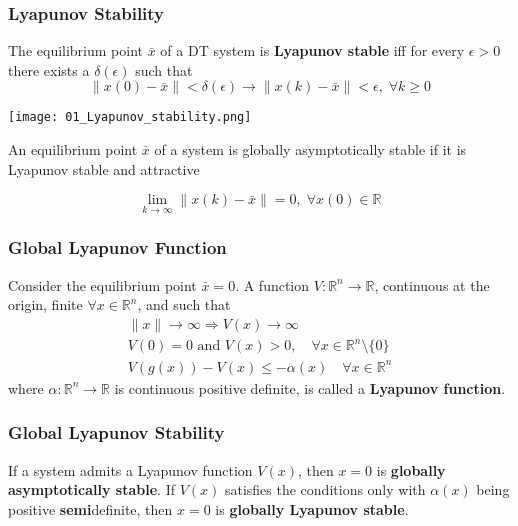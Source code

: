 \subsubsection{Lyapunov Stability}

The equilibrium point $\bar{x}$ of a DT system is \textbf{Lyapunov stable} iff for every $\epsilon >0$ there exists a $\delta(\epsilon)$ such that
\begin{equation*}
    \lVert x(0) - \bar{x} \rVert < \delta(\epsilon) \to \lVert x(k) - \bar{x} \rVert < \epsilon, \; \forall k \geq 0
\end{equation*}

\begin{center}
    \texttt{[image: 01\_Lyapunov\_stability.png]}
\end{center}


An equilibrium point $\bar{x}$ of a system is globally asymptotically stable if it is Lyapunov stable and attractive

\begin{equation*}
    \lim_{k\to\infty} \lVert x(k) - \bar{x} \rVert = 0, \; \forall x(0) \in \mathbb{R}
\end{equation*}


\subsubsection{Global Lyapunov Function}

Consider the equilibrium point $\bar{x}=0$. A function $V:\mathbb{R}^n\to \mathbb{R}$, continuous at the origin, finite $\forall x \in \mathbb{R}^n$, and such that
\begin{gather*}
    \lVert x \rVert \to \infty \Rightarrow V(x) \to \infty\\
    V(0)=0 \text{ and } V(x)>0, \quad \forall x \in \mathbb{R}^n \setminus\{0\}\\
    V(g(x)) - V(x) \leq -\alpha(x) \quad \forall x \in \mathbb{R}^n
\end{gather*}
where $\alpha:\mathbb{R}^n\to \mathbb{R}$ is continuous positive definite, is called a \textbf{Lyapunov function}.

\subsubsection{Global Lyapunov Stability}

If a system admits a Lyapunov function $V(x)$, then $x=0$ is \textbf{globally asymptotically stable}.
\newpar{}
If $V(x)$ satisfies the conditions only with $\alpha(x)$ being positive \textbf{semi}definite, then $x=0$ is \textbf{globally Lyapunov stable}.

